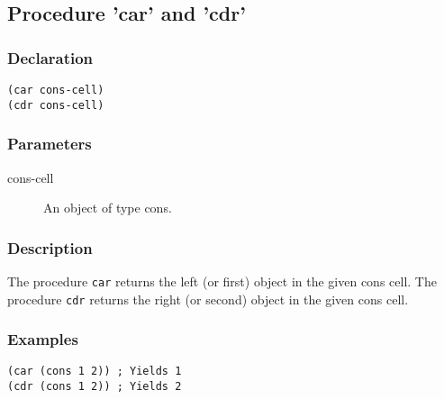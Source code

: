 \subsection{Procedure 'car' and 'cdr'}
\label{builtins/car-cdr}

\subsubsection*{Declaration}
\begin{lstlisting}
(car cons-cell)
(cdr cons-cell)
\end{lstlisting}

\subsubsection*{Parameters}
\begin{description}
	\item[cons-cell] An object of type cons.
\end{description}

\subsubsection*{Description}
The procedure \lstinline|car| returns the left (or first) object in the given cons cell. The procedure \lstinline|cdr| returns the right (or second) object in the given cons cell.

\subsubsection*{Examples}
\begin{lstlisting}
(car (cons 1 2)) ; Yields 1
(cdr (cons 1 2)) ; Yields 2
\end{lstlisting}
